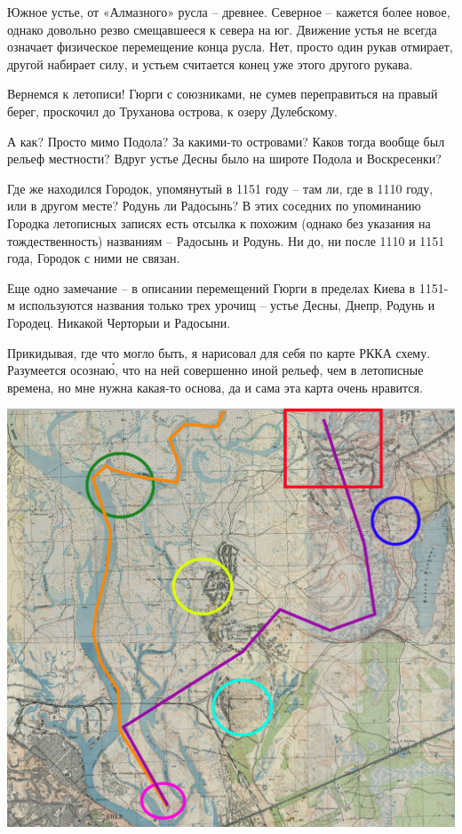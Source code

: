 Южное устье, от «Алмазного» русла – древнее. Северное – кажется более новое, однако довольно резво смещавшееся к севера на юг. Движение устья не всегда означает физическое перемещение конца русла. Нет, просто один рукав отмирает, другой набирает силу, и устьем считается конец уже этого другого рукава.

Вернемся к летописи! Гюрги с союзниками, не сумев переправиться на правый берег, проскочил до Труханова острова, к озеру Дулебскому.

А как? Просто мимо Подола? За какими-то островами? Каков тогда вообще был рельеф местности? Вдруг устье Десны было на широте Подола и Воскресенки?

Где же находился Городок, упомянутый в 1151 году – там ли, где в 1110 году, или в другом месте? Родунь ли Радосынь? В этих соседних по упоминанию Городка летописных записях есть отсылка к похожим (однако без указания на тождественность) названиям – Радосынь и Родунь. Ни до, ни после 1110 и 1151 года, Городок с ними не связан.

Еще одно замечание – в описании перемещений Гюрги в пределах Киева в 1151-м используются названия только трех урочищ – устье Десны, Днепр, Родунь и Городец. Никакой Черторыи и Радосыни.

Прикидывая, где что могло быть, я нарисовал для себя по карте РККА схему. Разумеется осозна\'ю, что на ней совершенно иной рельеф, чем в летописные времена, но мне нужна какая-то основа, да и сама эта карта очень нравится.

\begin{center}
\includegraphics[width=\linewidth]{chast-gorodki/letopisi/gurgi-dvij.jpg}
\end{center}

